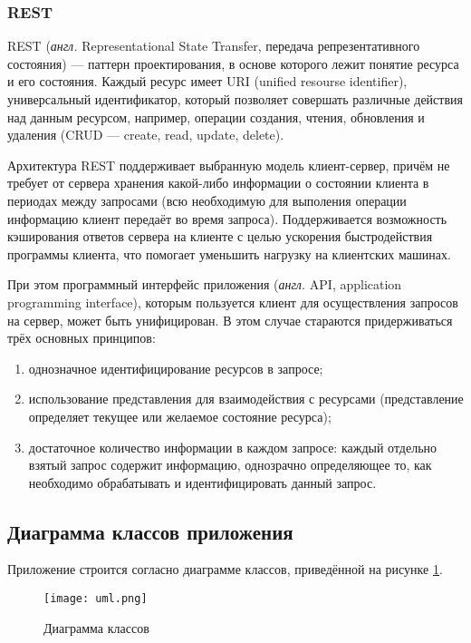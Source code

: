 \subsubsection{REST}

REST (\textit{англ.} Representational State Transfer, передача репрезентативного состояния) --- паттерн проектирования, в основе которого лежит понятие ресурса и его состояния. 
Каждый ресурс имеет URI (unified resourse identifier), универсальный идентификатор, который позволяет совершать различные действия над данным ресурсом, например, операции создания, чтения, обновления и удаления (CRUD --- create, read, update, delete).

Архитектура REST поддерживает выбранную модель клиент-сервер, причём не требует от сервера хранения какой-либо информации о состоянии клиента в периодах между запросами (всю необходимую для выполения операции информацию клиент передаёт во время запроса).
Поддерживается возможность кэширования ответов сервера на клиенте с целью ускорения быстродействия программы клиента, что помогает уменьшить нагрузку на клиентских машинах.

При этом программный интерфейс приложения (\textit{англ.} API, application \linebreak programming interface), которым пользуется клиент для осуществления запросов на сервер, может быть унифицирован.
В этом случае стараются придерживаться трёх основных принципов:
\begin{enumerate}[label=\arabic*)]
	\item однозначное идентифицирование ресурсов в запросе;
	\item использование представления для взаимодействия с ресурсами (представление определяет текущее или желаемое состояние ресурса);
	\item достаточное количество информации в каждом запросе: каждый отдельно взятый запрос содержит информацию, однозрачно определяющее то, как необходимо обрабатывать и идентифицировать данный запрос.
\end{enumerate}

\subsection{Диаграмма классов приложения}

Приложение строится согласно диаграмме классов, приведённой на рисунке \ref{fig:uml}.

\begin{figure}[h!]
	\centering
	\captionsetup{justification=centering}
	\texttt{[image: uml.png]}
	\caption{Диаграмма классов}
	\label{fig:uml}
\end{figure}


